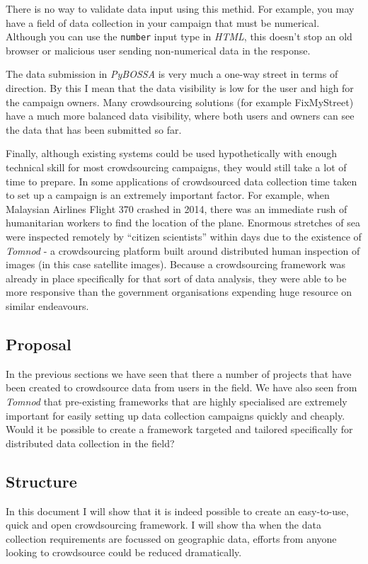 \documentclass{article}
\begin{document}
		There is no way to validate data input using this methid.
		For example, you may have a field of data collection in your campaign that must be numerical.
		Although you can use the \texttt{number} input type in \textit{HTML}, this doesn't stop an old browser or malicious user sending non-numerical data in the response.

		The data submission in \textit{PyBOSSA} is very much a one-way street in terms of direction. By this I mean that the data visibility is low for the user and high for the campaign owners. Many crowdsourcing solutions (for example FixMyStreet) have a much more balanced data visibility, where both users and owners can see the data that has been submitted so far.

		Finally, although existing systems could be used hypothetically with enough technical skill for most crowdsourcing campaigns, they would still take a lot of time to prepare. In some applications of crowdsourced data collection time taken to set up a campaign is an extremely important factor. For example, when Malaysian Airlines Flight 370 crashed in 2014, there was an immediate rush of humanitarian workers to find the location of the plane. Enormous stretches of sea were inspected remotely by ``citizen scientists'' within days due to the existence of \textit{Tomnod} - a crowdsourcing platform built around distributed human inspection of images (in this case satellite images)\cite{_missing_2014}. Because a crowdsourcing framework was already in place specifically for that sort of data analysis, they were able to be more responsive than the government organisations expending huge resource on similar endeavours.

		\subsection{Proposal}
		In the previous sections we have seen that there a number of projects that have been created to crowdsource data from users in the field. We have also seen from \textit{Tomnod} that pre-existing frameworks that are highly specialised are extremely important for easily setting up data collection campaigns quickly and cheaply. Would it be possible to create a framework targeted and tailored specifically for distributed data collection in the field?

		\subsection{Structure}
		In this document I will show that it is indeed possible to create an easy-to-use, quick and open crowdsourcing framework. I will show tha when the data collection requirements are focussed on geographic data, efforts from anyone looking to crowdsource could be reduced dramatically.
\end{document}
